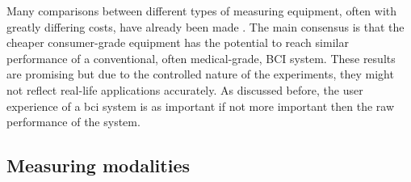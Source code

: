 Many comparisons between different types of measuring equipment, often with greatly differing costs, have already been made \citep{bci_cheap_viability1, bci_cheap_viability2, bci_cheap_viability3, bci_cheap_viability4, bci_cheap_viability5}.
The main consensus is that the cheaper consumer-grade equipment has the potential to reach similar performance of a conventional, often medical-grade, BCI system.
These results are promising but due to the controlled nature of the experiments, they might not reflect real-life applications accurately.
As discussed before, the user experience of a \gls{bci} system is as important if not more important then the raw performance of the system.


\subsection{Measuring modalities}
\label{subsec:biomedical_signals_measuring_modalities}





